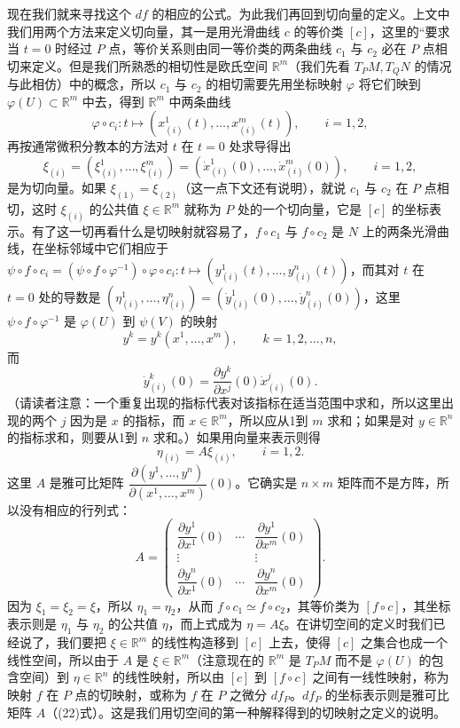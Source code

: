 现在我们就来寻找这个 $df$ 的相应的公式。为此我们再回到切向量的定义。上文中我们用两个方法来定义切向量，其一是用光滑曲线 $c$ 的等价类 $[c]$，这里的“要求当 $t=0$ 时经过 $P$ 点，等价关系则由同一等价类的两条曲线 $c_1$ 与 $c_2$ 必在 $P$ 点相切来定义。但是我们所熟悉的相切性是欧氏空间 $\mathbb R^m$（我们先看 $T_PM,T_QN$ 的情况与此相仿）中的概念，所以 $c_1$ 与 $c_2$ 的相切需要先用坐标映射 $\varphi$ 将它们映到 $\varphi(U)\subset\mathbb R^m$ 中去，得到 $\mathbb R^m$ 中两条曲线
\[
 \varphi\circ c_i:t\mapsto(x_{(i)}^1(t),\ldots,x_{(i)}^m(t)),\qquad i=1,2,
\]
再按通常微积分教本的方法对 $t$ 在 $t=0$ 处求导得出
\[
 \xi_{(i)}=(\xi_{(i)}^1,\ldots,\xi_{(i)}^m)
 =(\dot x_{(i)}^1(0),\ldots,\dot x_{(i)}^m(0)),\qquad i=1,2,
\]
是为切向量。如果 $\xi_{(1)}=\xi_{(2)}$（这一点下文还有说明），就说 $c_1$ 与 $c_2$ 在 $P$ 点相切，这时 $\xi_{(i)}$ 的公共值 $\xi\in\mathbb R^m$ 就称为 $P$ 处的一个切向量，它是 $[c]$ 的坐标表示。有了这一切再看什么是切映射就容易了，$f\circ c_1$ 与 $f\circ c_2$ 是 $N$ 上的两条光滑曲线，在坐标邻域中它们相应于 $\psi\circ f\circ c_i=(\psi\circ f\circ\varphi^{-1})\circ\varphi\circ c_i:t\mapsto(y_{(i)}^1(t),\ldots,y_{(i)}^n(t))$，而其对 $t$ 在 $t=0$ 处的导数是 $(\eta_{(i)}^1,\ldots,\eta_{(i)}^n)=(\dot y_{(i)}^1(0),\ldots,\dot y_{(i)}^n(0))$，这里 $\psi\circ f\circ\varphi^{-1}$ 是 $\varphi(U)$ 到 $\psi(V)$ 的映射
\[
 y^k=y^k(x^1,\ldots,x^m),\qquad k=1,2,\ldots,n,
\]
而
\[
 \dot y_{(i)}^k(0)=\frac{\partial y^k}{\partial x^j}(0)\dot x_{(i)}^j(0).
\]
（请读者注意：一个重复出现的指标代表对该指标在适当范围中求和，所以这里出现的两个 $j$ 因为是 $x$ 的指标，而 $x\in\mathbb R^m$，所以应从1到 $m$ 求和；如果是对 $y\in\mathbb R^n$ 的指标求和，则要从1到 $n$ 求和。）如果用向量来表示则得
\[
 \eta_{(i)}=A\xi_{(i)},\qquad i=1,2.
\]
这里 $A$ 是雅可比矩阵 $\dfrac{\partial(y^1,\ldots,y^n)}{\partial(x^1,\ldots,x^m)}(0)$。它确实是 $n\times m$ 矩阵而不是方阵，所以没有相应的行列式：
\begin{equation}
 A=
 \begin{pmatrix}
 \dfrac{\partial y^1}{\partial x^1}(0)&\cdots&\dfrac{\partial y^1}{\partial x^m}(0)\\
 \vdots&&\vdots\\
 \dfrac{\partial y^n}{\partial x^1}(0)&\cdots&\dfrac{\partial y^n}{\partial x^m}(0)
 \end{pmatrix}.
 \tag{22}
\end{equation}
因为 $\xi_1=\xi_2=\xi$，所以 $\eta_1=\eta_2$，从而 $f\circ c_1\simeq f\circ c_2$，其等价类为 $[f\circ c]$，其坐标表示则是 $\eta_1$ 与 $\eta_2$ 的公共值 $\eta$，而上式成为 $\eta=A\xi$。在讲切空间的定义时我们已经说了，我们要把 $\xi\in\mathbb R^m$ 的线性构造移到 $[c]$ 上去，使得 $[c]$ 之集合也成一个线性空间，所以由于 $A$ 是 $\xi\in\mathbb R^m$（注意现在的 $\mathbb R^m$ 是 $T_PM$ 而不是 $\varphi(U)$ 的包含空间）到 $\eta\in\mathbb R^n$ 的线性映射，所以由 $[c]$ 到 $[f\circ c]$ 之间有一线性映射，称为映射 $f$ 在 $P$ 点的切映射，或称为 $f$ 在 $P$ 之微分 $df_P$。$df_P$ 的坐标表示则是雅可比矩阵 $A$（(22)式）。这是我们用切空间的第一种解释得到的切映射之定义的说明。

